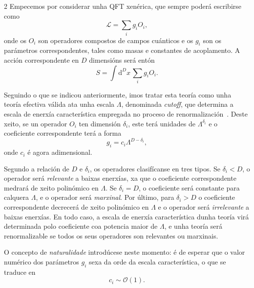 \begin{multicols}{2}
Empecemos por considerar unha QFT xenérica, que sempre poderá escribirse como
%
\begin{equation}
    \mathcal{L} = \sum_i g_i O_i,
\end{equation}
%
onde os $O_i$ son operadores compostos de campos cuánticos e os $g_i$ son os
parámetros correspondentes, tales como masas e constantes de acoplamento. A
acción correspondente en $D$ dimensións será entón
%
\begin{equation}
    S = \int \text{d}^D x \, \sum_i g_i O_i.
\end{equation}

Seguindo o que se indicou anteriormente, imos tratar esta teoría como unha
teoría efectiva válida ata unha escala $\Lambda$, denominada \textit{cutoff},
que determina a escala de enerxía característica empregada no proceso de
renormalización~\cite{Polchinski}. Deste xeito, se un operador $O_i$ ten
dimensión $\delta_i$, este terá unidades de $\Lambda^{\delta_i}$ e o
coeficiente correspondente terá a forma
%
\begin{equation}
    g_i = c_i \Lambda^{D-\delta_i},
\end{equation}
%
onde $c_i$ é agora adimensional.

Segundo a relación de $D$ e $\delta_i$, os operadores clasifícanse en tres
tipos. Se $\delta_i < D$, o operador será \textit{relevante} a baixas enerxías,
xa que o coeficiente correspondente medrará de xeito polinómico en $\Lambda$.
Se $\delta_i = D$, o coeficiente será constante para calquera $\Lambda$, e o
operador será \textit{marxinal}. Por último, para $\delta_i > D$ o coeficiente
correspondente decrecerá de xeito polinómico en $\Lambda$ e o operador será
\textit{irrelevante} a baixas enerxías. En todo caso, a escala de enerxía
característica dunha teoría virá determinada polo coeficiente coa potencia
maior de $\Lambda$, e unha teoría será renormalizable se todos os seus
operadores son relevantes ou marxinais.

O concepto de \textit{naturalidade} introdúcese neste momento: é de esperar que
o valor numérico dos parámetros $g_i$ sexa da orde da escala característica, o
que se traduce en
%
\begin{equation}
    c_i \sim \mathcal{O}(1).
\end{equation}


\end{multicols}
